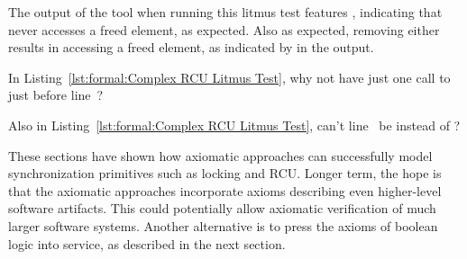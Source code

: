 \begin{lineref}
The output of the  tool when running this litmus test features
, indicating that  never accesses a freed element,
as expected.
Also as expected, removing either  results
in  accessing a freed element, as indicated by 
in the  output.
\end{lineref}

\QuickQuiz{}
	\begin{lineref}
	In Listing~\ref{lst:formal:Complex RCU Litmus Test},
	why not have just one call to 
	just before line~?
	\end{lineref}
 \QuickQuizEnd

\QuickQuiz{}
	\begin{lineref}
	Also in Listing~\ref{lst:formal:Complex RCU Litmus Test},
	can't line~ be  instead
	of ?
	\end{lineref}
 \QuickQuizEnd

These sections have shown how axiomatic approaches can successfully
model synchronization primitives such as locking and RCU.
Longer term, the hope is that the axiomatic approaches incorporate
axioms describing even higher-level software artifacts.
This could potentially allow axiomatic verification of much larger
software systems.
Another alternative is to press the axioms of boolean logic into service,
as described in the next section.
